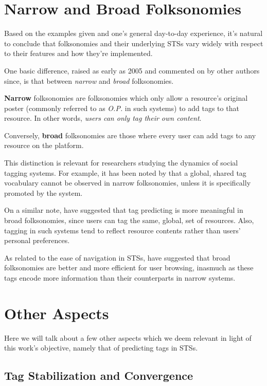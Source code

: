 \section{Narrow and Broad Folksonomies}

Based on the examples given and one's general day-to-day experience, it's natural to conclude that folksonomies and their underlying STSs vary widely with respect to their features and how they're implemented.

One basic difference, raised as early as 2005 \citep{wal_2005_broad_and_narrow} and commented on by other authors \citep{marlow_etal_2006,halpin_etal_2006,peters_2009} since, is that between \textit{narrow} and \textit{broad} folksonomies.

\textbf{Narrow} folksonomies are folksonomies which only allow a resource's original poster (commonly referred to as \textit{O.P.} in such systems) to add tags to that resource. In other words, \textit{users can only tag their own content}.

Conversely, \textbf{broad} folksonomies are those where every user can add tags to any resource on the platform.

This distinction is relevant for researchers studying the dynamics of social tagging systems. For example, it has been noted by \cite{schifanella_etal_2010} that a global, shared tag vocabulary cannot be observed in narrow folksonomies, unless it is specifically promoted by the system.

On a similar note, \cite{aiello_2012} have suggested that tag predicting is more meaningful in broad folksonomies, since users can tag the same, global, set of resources. Also, tagging in such systems tend to reflect resource contents rather than users' personal preferences.

As related to the ease of navigation in STSs, \cite{helic_etal_2012} have suggested that broad folksonomies are better and more efficient for user browsing, inasmuch as these tags encode more information than their counterparts in narrow systems.

\section{Other Aspects}

Here we will talk about a few other aspects which we deem relevant in light of this work's objective, namely that of predicting tags in STSs.

\subsection{Tag Stabilization and Convergence}

